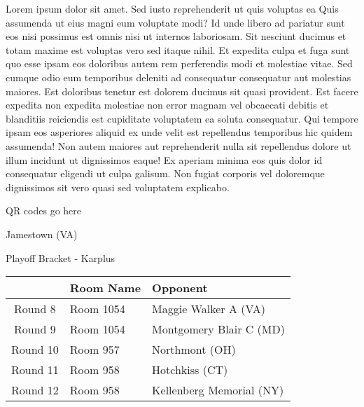 \documentclass{article}%
\begin{document}
\vspace*{8pt}%
\linebreak%
\newline%
\newline%
Lorem ipsum dolor sit amet. Sed iusto reprehenderit ut quis voluptas ea Quis assumenda ut eius magni eum voluptate modi? Id unde libero ad pariatur sunt eos nisi possimus est omnis nisi ut internos laboriosam. Sit nesciunt ducimus et totam maxime est voluptas vero sed itaque nihil. Et expedita culpa et fuga sunt quo esse ipsam eos doloribus autem rem perferendis modi et molestiae vitae.\newline%
\newline%
Sed cumque odio eum temporibus deleniti ad consequatur consequatur aut molestias maiores. Est doloribus tenetur est dolorem ducimus sit quasi provident. Est facere expedita non expedita molestiae non error magnam vel obcaecati debitis et blanditiis reiciendis est cupiditate voluptatem ea soluta consequatur. Qui tempore ipsam eos asperiores aliquid ex unde velit est repellendus temporibus hic quidem assumenda!\newline%
\newline%
Non autem maiores aut reprehenderit nulla sit repellendus dolore ut illum incidunt ut dignissimos eaque! Ex aperiam minima eos quis dolor id consequatur eligendi ut culpa galisum. Non fugiat corporis vel doloremque dignissimos sit vero quasi sed voluptatem explicabo.\newline%
\newline%
%
\vspace*{30pt}%
\begin{center}%
\begin{Huge}%
QR codes go here%
\end{Huge}%
\end{center}%
\newpage%
\begin{center}%
\begin{Huge}%
Jamestown (VA)%
\end{Huge}%
\vspace*{8pt}%
\linebreak%
\begin{Large}%
Playoff Bracket {-} Karplus%
\end{Large}%
\end{center}%
%
\begin{tabularx}{\textwidth}{|c|Y|Y|}%
\hline%
&Room Name&Opponent\\%
\hline%
Round 8&Room 1054&Maggie Walker A (VA)\\%
Round 9&Room 1054&Montgomery Blair C (MD)\\%
Round 10&Room 957&Northmont (OH)\\%
Round 11&Room 958&Hotchkiss (CT)\\%
Round 12&Room 958&Kellenberg Memorial (NY)\\%
\hline%
\end{tabularx}%
\end{document}
